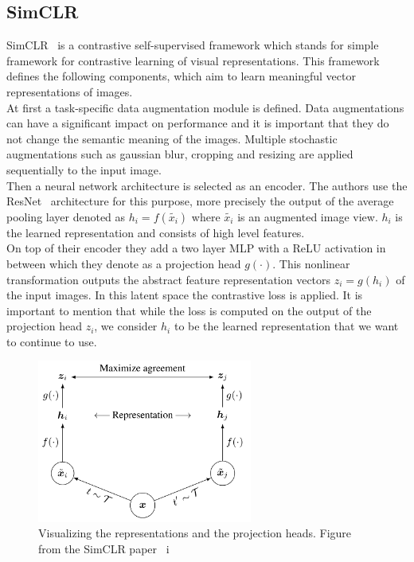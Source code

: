 \documentclass{article}
\begin{document}
\subsection{SimCLR}

SimCLR~\cite{DBLP:journals/corr/abs-2002-05709} is a contrastive self-supervised framework which stands for simple framework for contrastive learning of visual representations.
This framework defines the following components, which aim to learn  meaningful vector representations of images.\\
At first a task-specific data augmentation module is defined. Data augmentations can have a significant impact on performance and it is important that they do not change the semantic meaning of the images. 
Multiple stochastic augmentations such as gaussian blur, cropping and resizing are applied sequentially to the input image.\\
Then a neural network architecture is selected as an encoder.
The authors use the ResNet~\cite{he2015deep} architecture for this purpose, more precisely the output of the average pooling layer denoted as $h_i = f(\tilde{x_i})$ where $\tilde{x_i}$ is an augmented image view. $h_i$ is the learned representation and consists of
high level features.\\
On top of their encoder they add a two layer MLP with a ReLU activation in between which they denote as a projection head $g(\cdot)$. This
nonlinear transformation outputs the abstract feature representation vectors $z_i = g(h_i)$ of the input images. In this latent space the
contrastive loss is applied. It is important to mention that while the loss is computed on the
output of the projection head $z_i$, we consider $h_i$ to be the learned representation that we want to continue to use. \\

\begin{figure}[h]
  \centering
  \includegraphics[width = 200pt]{simclr.png}
  \caption{Visualizing the representations and the projection heads. Figure from the SimCLR paper~\cite{DBLP:journals/corr/abs-2002-05709} i}
\end{figure}
\end{document}
